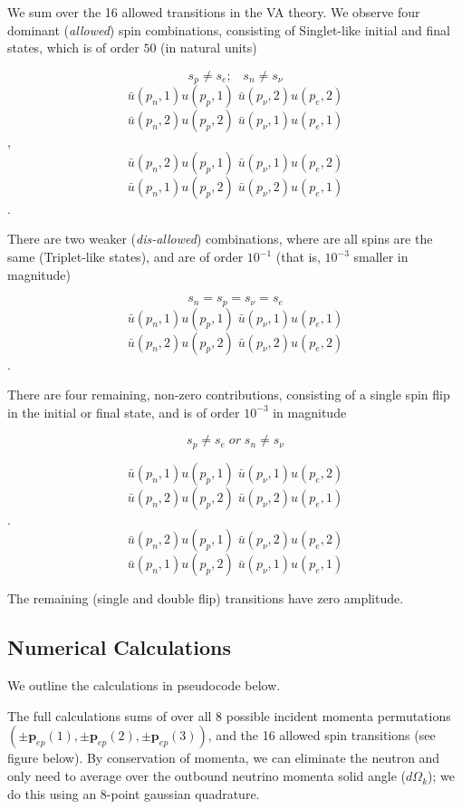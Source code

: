 \documentclass[%
 aip,
 jmp,%
 amsmath,amssymb,
 reprint,%
]{revtex4-1}
\begin{document}
We sum over the 16  allowed transitions in the VA theory.  
We observe four dominant (\emph{allowed}) spin combinations, 
consisting of Singlet-like initial and final states,  which is of order $50$ (in natural units)

$$s_{p}\neq s{_e};\;\;\;s_{n}\neq s_{\nu}$$
$$\bar{u}(p_{n},1)u(p_{p},1)\;\bar{u}(p_{\nu},2)u(p_{e},2)$$
$$\bar{u}(p_{n},2)u(p_{p},2)\;\bar{u}(p_{\nu},1)u(p_{e},1)$$,
$$\bar{u}(p_{n},2)u(p_{p},1)\;\bar{u}(p_{\nu},1)u(p_{e},2)$$
$$\bar{u}(p_{n},1)u(p_{p},2)\;\bar{u}(p_{\nu},2)u(p_{e},1)$$.

There are two weaker (\emph{dis-allowed}) combinations, 
where are all spins are the same (Triplet-like states), and are of order $10^{-1}$ (that is, $10^{-3}$ smaller in magnitude)

$$s_{n}=s_{p}=s_{\nu}=s{_e}$$
$$\bar{u}(p_{n},1)u(p_{p},1)\;\bar{u}(p_{\nu},1)u(p_{e},1)$$
$$\bar{u}(p_{n},2)u(p_{p},2)\;\bar{u}(p_{\nu},2)u(p_{e},2)$$.

There are four remaining, non-zero contributions, consisting of a single spin flip
in the initial or final state, and is of order $10^{-3}$ in magnitude

$$s_{p}\neq s{_e}\;{or}\;s_{n}\neq s_{\nu}$$

$$\bar{u}(p_{n},1)u(p_{p},1)\;\bar{u}(p_{\nu},1)u(p_{e},2)$$
$$\bar{u}(p_{n},2)u(p_{p},2)\;\bar{u}(p_{\nu},2)u(p_{e},1)$$.
$$\bar{u}(p_{n},2)u(p_{p},1)\;\bar{u}(p_{\nu},2)u(p_{e},2)$$
$$\bar{u}(p_{n},1)u(p_{p},2)\;\bar{u}(p_{\nu},1)u(p_{e},1)$$


The remaining (single and double flip) transitions have zero amplitude.

\subsection{Numerical Calculations}

We outline the calculations in pseudocode below.  

The full calculations sums of over all 8 possible incident momenta permutations
  $(\pm\mathbf{p}_{ep}(1),\pm\mathbf{p}_{ep}(2),\pm\mathbf{p}_{ep}(3) )$,
and the 16 allowed spin transitions (see figure below). By conservation of momenta, we can eliminate the neutron and only need to average over the outbound neutrino momenta solid angle ($d\Omega_k$); we do this using an 8-point gaussian quadrature. 
\end{document}
